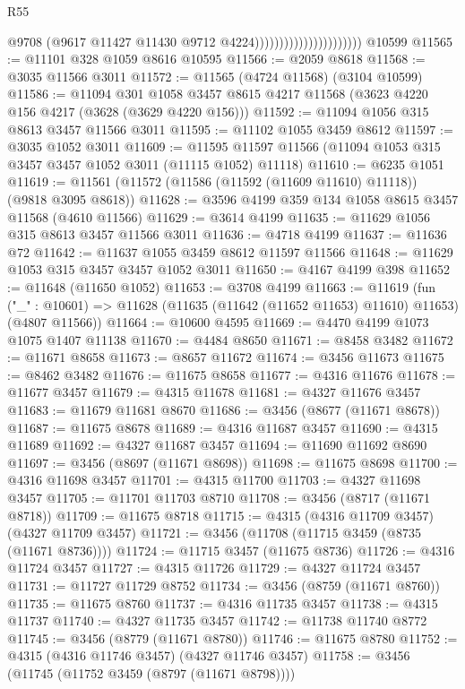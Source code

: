 \begin{lexlean}{R55}
\begin{coremodule}
                                              @9708
                                              (@9617 @11427 @11430 @9712 @4224))))))))))))))))))))))
    @10599
@11565 := @11101 @328 @1059 @8616 @10595
@11566 := @2059 @8618
@11568 := @3035 @11566 @3011
@11572 := @11565 (@4724 @11568) (@3104 @10599)
@11586 := @11094
    @301
    @1058
    @3457
    @8615
    @4217
    @11568
    (@3623 @4220 @156 @4217 (@3628 (@3629 @4220 @156)))
@11592 := @11094 @1056 @315 @8613 @3457 @11566 @3011
@11595 := @11102 @1055 @3459 @8612
@11597 := @3035 @1052 @3011
@11609 := @11595 @11597 @11566 (@11094 @1053 @315 @3457 @3457 @1052 @3011 (@11115 @1052) @11118)
@11610 := @6235 @1051
@11619 := @11561 (@11572 (@11586 (@11592 (@11609 @11610) @11118)) (@9818 @3095 @8618))
@11628 := @3596 @4199 @359 @134 @1058 @8615 @3457 @11568 (@4610 @11566)
@11629 := @3614 @4199
@11635 := @11629 @1056 @315 @8613 @3457 @11566 @3011
@11636 := @4718 @4199
@11637 := @11636 @72
@11642 := @11637 @1055 @3459 @8612 @11597 @11566
@11648 := @11629 @1053 @315 @3457 @3457 @1052 @3011
@11650 := @4167 @4199 @398
@11652 := @11648 (@11650 @1052)
@11653 := @3708 @4199
@11663 := @11619
    (fun ("_" : @10601) => @11628 (@11635 (@11642 (@11652 @11653) @11610) @11653) (@4807 @11566))
@11664 := @10600 @4595
@11669 := @4470 @4199 @1073 @1075 @1407 @11138
@11670 := @4484 @8650
@11671 := @8458 @3482
@11672 := @11671 @8658
@11673 := @8657 @11672
@11674 := @3456 @11673
@11675 := @8462 @3482
@11676 := @11675 @8658
@11677 := @4316 @11676
@11678 := @11677 @3457
@11679 := @4315 @11678
@11681 := @4327 @11676 @3457
@11683 := @11679 @11681 @8670
@11686 := @3456 (@8677 (@11671 @8678))
@11687 := @11675 @8678
@11689 := @4316 @11687 @3457
@11690 := @4315 @11689
@11692 := @4327 @11687 @3457
@11694 := @11690 @11692 @8690
@11697 := @3456 (@8697 (@11671 @8698))
@11698 := @11675 @8698
@11700 := @4316 @11698 @3457
@11701 := @4315 @11700
@11703 := @4327 @11698 @3457
@11705 := @11701 @11703 @8710
@11708 := @3456 (@8717 (@11671 @8718))
@11709 := @11675 @8718
@11715 := @4315 (@4316 @11709 @3457) (@4327 @11709 @3457)
@11721 := @3456 (@11708 (@11715 @3459 (@8735 (@11671 @8736))))
@11724 := @11715 @3457 (@11675 @8736)
@11726 := @4316 @11724 @3457
@11727 := @4315 @11726
@11729 := @4327 @11724 @3457
@11731 := @11727 @11729 @8752
@11734 := @3456 (@8759 (@11671 @8760))
@11735 := @11675 @8760
@11737 := @4316 @11735 @3457
@11738 := @4315 @11737
@11740 := @4327 @11735 @3457
@11742 := @11738 @11740 @8772
@11745 := @3456 (@8779 (@11671 @8780))
@11746 := @11675 @8780
@11752 := @4315 (@4316 @11746 @3457) (@4327 @11746 @3457)
@11758 := @3456 (@11745 (@11752 @3459 (@8797 (@11671 @8798))))

\end{coremodule}
\end{lexlean}
